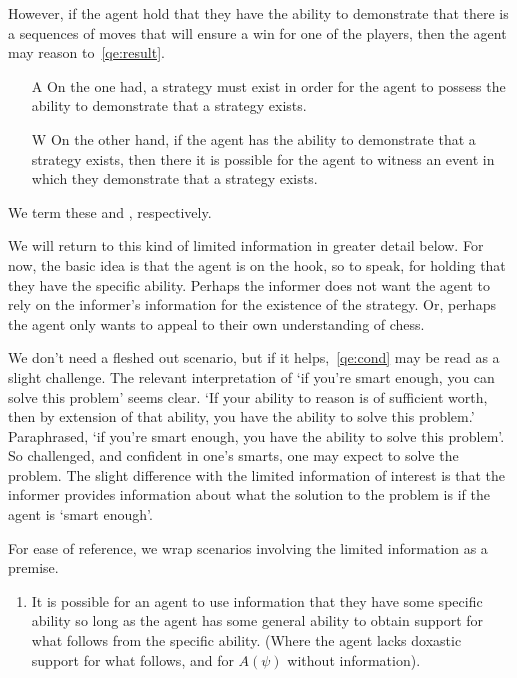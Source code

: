 \begin{note}
  However, if the agent hold that they have the ability to demonstrate that there is a sequences of moves that will ensure a win for one of the players, then the agent may reason to~\ref{qe:result}.

  \begin{enumerate}
  \item[\textsf{A}]\label{A:s} On the one had, a strategy must exist in order for the agent to possess the ability to demonstrate that a strategy exists.
  \item[\textsf{W}]\label{W:s} On the other hand, if the agent has the ability to demonstrate that a strategy exists, then there it is possible for the agent to witness an event in which they demonstrate that a strategy exists.
  \end{enumerate}
  We term these \AR{} and \WR{}, respectively.

  We will return to this kind of limited information in greater detail below.
  For now, the basic idea is that the agent is on the hook, so to speak, for holding that they have the specific ability.
  Perhaps the informer does not want the agent to rely on the informer's information for the existence of the strategy.
  Or, perhaps the agent only wants to appeal to their own understanding of chess.

  We don't need a fleshed out scenario, but if it helps,~\ref{qe:cond} may be read as a slight challenge.
  The relevant interpretation of `if you're smart enough, you can solve this problem' seems clear.
  `If your ability to reason is of sufficient worth, then by extension of that ability, you have the ability to solve this problem.'
  Paraphrased, `if you're smart enough, you have the ability to solve this problem'.
  So challenged, and confident in one's smarts, one may expect to solve the problem.
  The slight difference with the limited information of interest is that the informer provides information about what the solution to the problem is if the agent is `smart enough'.
\end{note}

\begin{note}
  For ease of reference, we wrap scenarios involving the limited information as a premise.
  \begin{enumerate}[label=\eA{}, ref=\eA{}]
  \item\label{prem:ab} It is possible for an agent to use information that they have some specific ability so long as the agent has some general ability to obtain support for what follows from the specific ability.
    (Where the agent lacks doxastic support for what follows, and for \(A(\psi)\) without information).
  \end{enumerate}
\end{note}

